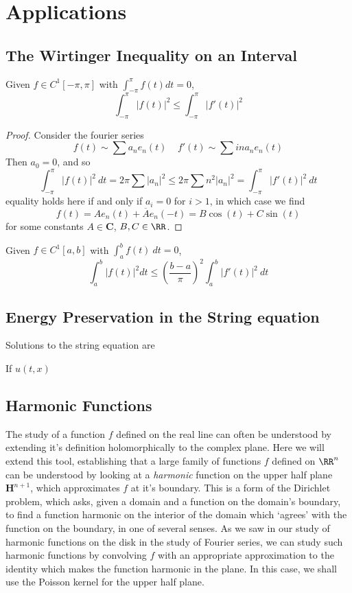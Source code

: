 \chapter{Applications}

\section{The Wirtinger Inequality on an Interval}

\begin{theorem}
    Given $f \in C^1[-\pi,\pi]$ with $\int_{-\pi}^\pi f(t) dt = 0$,
    \[ \int_{-\pi}^\pi |f(t)|^2 \leq \int_{-\pi}^\pi |f'(t)|^2 \]
\end{theorem}
\begin{proof}
    Consider the fourier series
    \[ f(t) \sim \sum a_n e_n(t)\ \ \ \ \ f'(t) \sim \sum in a_n e_n(t) \]
    Then $a_0 = 0$, and so
    \[ \int_{-\pi}^\pi |f(t)|^2\ dt = 2 \pi \sum |a_n|^2 \leq 2 \pi \sum n^2 |a_n|^2 = \int_{-\pi}^\pi |f'(t)|^2\ dt \]
    equality holds here if and only if $a_i = 0$ for $i > 1$, in which case we find
    \[ f(t) = A e_n(t) + \overline{A} e_n(-t) = B \cos(t) + C \sin(t) \]
    for some constants $A \in \mathbf{C}$, $B,C \in \RR$.
\end{proof}

\begin{corollary}
    Given $f \in C^1[a,b]$ with $\int_a^b f(t)\ dt = 0$,
    \[ \int_a^b |f(t)|^2 dt \leq \left(\frac{b-a}{\pi}\right)^2 \int_a^b |f'(t)|^2\ dt \]
\end{corollary}

\section{Energy Preservation in the String equation}

Solutions to the string equation are

If $u(t,x)$

\section{Harmonic Functions} 

The study of a function $f$ defined on the real line can often be understood by extending it's definition holomorphically to the complex plane. Here we will extend this tool, establishing that a large family of functions $f$ defined on $\RR^n$ can be understood by looking at a {\it harmonic} function on the upper half plane $\mathbf{H}^{n+1}$, which approximates $f$ at it's boundary. This is a form of the Dirichlet problem, which asks, given a domain and a function on the domain's boundary, to find a function harmonic on the interior of the domain which `agrees' with the function on the boundary, in one of several senses. As we saw in our study of harmonic functions on the disk in the study of Fourier series, we can study such harmonic functions by convolving $f$ with an appropriate approximation to the identity which makes the function harmonic in the plane. In this case, we shall use the Poisson kernel for the upper half plane.

